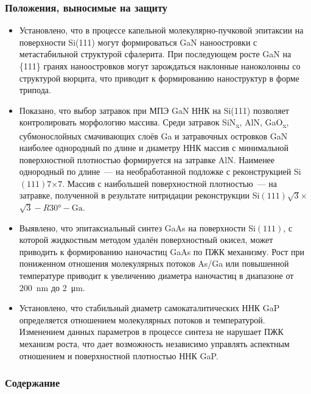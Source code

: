 \begin{frame}
    \setcounter{framenumber}{1}
    \maketitle
\end{frame}

\begin{frame}
    \frametitle{Положения, выносимые на защиту}
    \begin{itemize}
  \item	Установлено, что в процессе капельной молекулярно-пучковой эпитаксии на
    поверхности Si(111) могут формироваться GaN наноостровки с метастабильной
    структурой сфалерита. При последующем росте GaN
   на \{111\} гранях наноостровков могут зарождаться наклонные наноколонны со
   структурой вюрцита, что приводит к формированию наноструктур в форме
   трипода.
 \item Показано, что выбор затравок при МПЭ GaN ННК на Si(111) позволяет
   контролировать морфологию массива. Среди затравок SiN\textsubscript{x}, AlN,
   GaO\textsubscript{x}, субмонослойных смачивающих слоёв Ga и затравочных
   островков GaN наиболее однородный по длине и диаметру ННК массив с
   минимальной поверхностной плотностью формируется на затравке AlN. Наименее
   однородный по длине~--- на необработанной подложке с реконструкцией
   Si\((111)7\)\(\times\)\(7\). Массив с наибольшей поверхностной
   плотностью~--- на затравке, полученной в результате нитридации реконструкции
   Si\((111)\sqrt{3}\)\(\times\)\(\sqrt{3} - R30\si{\degree} - \text{Ga}\).
 \item Выявлено, что эпитаксиальный синтез GaAs на поверхности Si\((111)\), с
   которой жидкостным методом удалён поверхностный окисел, может приводить к
   формированию наночастиц GaAs по ПЖК механизму. Рост при пониженном отношения
   молекулярных потоков As/Ga или повышенной температуре приводит к увеличению
   диаметра наночастиц в диапазоне от 200~\si{\nano\metre} до
   2~\si{\micro\metre}.
 \item Установлено, что стабильный диаметр самокаталитических ННК GaP
   определяется отношением молекулярных потоков и температурой. Изменением
   данных параметров в процессе синтеза не нарушает ПЖК механизм роста, что
   дает возможность независимо управлять аспектным отношением и поверхностной
   плотностью ННК GaP.
    \end{itemize}
\end{frame}

\begin{frame}
    \frametitle{Содержание}
    \tableofcontents
\end{frame}
